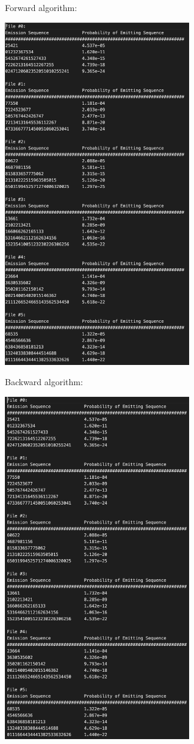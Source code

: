 \begin{solution}
  Forward algorithm:
  \begin{center}
  \includegraphics[width=0.6\textwidth]{prob2bi.png}
  \end{center}
  Backward algorithm:
  \begin{center}
  \includegraphics[width=0.6\textwidth]{prob2bii.png}
  \end{center}
\end{solution}


